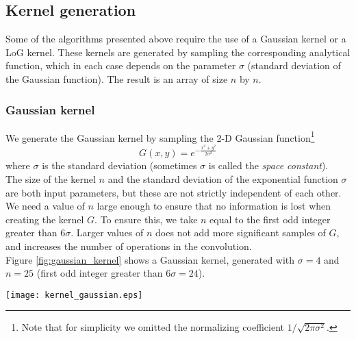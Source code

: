 \documentclass{ipol}
\numberwithin{equation}{section}
\numberwithin{table}{section}
\numberwithin{figure}{section}
\begin{document}
\subsection{Kernel generation}
\label{sec:appendix2}

Some of the algorithms presented above require the use of a Gaussian kernel or a LoG kernel. These 
kernels are generated by sampling the corresponding analytical function, which in each case depends 
on the parameter $\sigma$ (standard deviation of the Gaussian function). The result is an array of 
size $n$ by $n$.\\

\subsubsection{Gaussian kernel}

We generate the Gaussian kernel by sampling the 2-D Gaussian function\footnote{Note that for simplicity 
we omitted the normalizing coefficient $1/\sqrt{2\pi\sigma^2}$.}
\begin{equation}
	\label{eq:gaussian_function}
	G(x,y) = e^{-\frac{x^2+y^2}{2\sigma^2}}
\end{equation}
where $\sigma$ is the standard deviation (sometimes $\sigma$ is called the \textit{space constant}).\\

The size of the kernel $n$ and the standard deviation of the exponential function $\sigma$ are both 
input parameters, but these are not strictly independent of each other. We need a value 
of $n$ large enough to ensure that no information is lost when creating the kernel $G$. To ensure this, we take 
$n$ equal to the first odd integer greater than $6\sigma$. Larger values of $n$ does not add more 
significant samples ​​of $G$, and increases the number of operations in the convolution.\\

Figure \ref{fig:gaussian_kernel} shows a Gaussian kernel, generated with $\sigma = 4$ and $n = 25$ 
(first odd integer greater than $6\sigma=24$).\\

\begin{SCfigure}[][!t]
	\centering
	\texttt{[image: kernel\_gaussian.eps]}
	\caption{Gaussian kernel, $\sigma=4$, $n=25$. Is easy to see that the selected value of n is 
sufficient to have a good approximation of the Gaussian function in the kernel.}
	\label{fig:gaussian_kernel}
\end{SCfigure}
\end{document}
